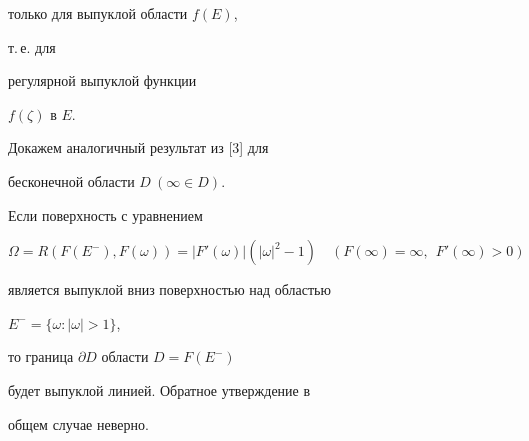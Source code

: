 только для выпуклой области $f(E)$, 


т.\,е. для 


регулярной выпуклой функции 


$f(\zeta)$ в $E$. 


 


Докажем аналогичный результат из [3] для 


бесконечной области $D\ (\infty\in D)$. 


 


\begin{thm} 


Если поверхность с уравнением 


\begin{equation} 


\Omega=R(F(E^-),F(\omega))=|F'(\omega)|(|\omega|^2-1)\quad 


(F(\infty)=\infty,\ \ F'(\infty)>0) 


\end{equation} 


является выпуклой вниз поверхностью над областью 


$E^-=\{\omega:|\omega|>1\}$, 


то граница $\partial D$ области $D=F(E^-)$ 


будет выпуклой линией. Обратное утверждение в 


общем случае неверно. 


\end{thm} 


 


 



